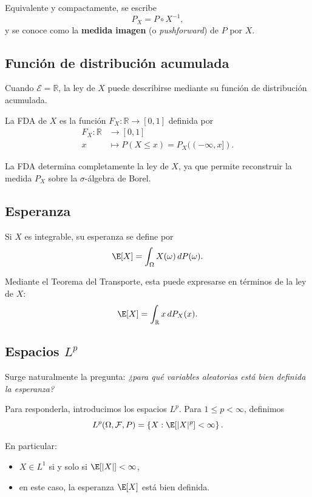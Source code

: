 Equivalente y compactamente, se escribe
\[
P_X = P \circ X^{-1},
\]
y se conoce como la \textbf{medida imagen} (o \textit{pushforward}) de $P$ por $X$.

\subsection{Función de distribución acumulada}

Cuando $\mathcal{E} = \mathbb{R}$, la ley de $X$ puede describirse mediante su función de distribución acumulada.

\begin{defi}
La FDA de $X$ es la función $F_X:\mathbb{R} \to [0,1]$ definida por
\[
\begin{aligned}
F_X : \mathbb{R} &\to [0,1] \\
x &\mapsto P(X \leq x) = P_X((-\infty, x]).
\end{aligned}
\]
\end{defi}

La FDA determina completamente la ley de $X$, ya que permite reconstruir la medida $P_X$ sobre la $\sigma$-álgebra de Borel.

\subsection{Esperanza}

\begin{defi}[Esperanza]
Si $X$ es integrable, su esperanza se define por
\[
\E[X] = \int_{\Omega} X(\omega) \, dP(\omega).
\]
\end{defi}

Mediante el Teorema del Transporte, esta puede expresarse en términos de la ley de $X$:
\[
\E[X] = \int_{\mathbb{R}} x \, dP_X(x).
\]

\subsection{Espacios \texorpdfstring{$L^p$}{Lp}}

Surge naturalmente la pregunta: \textit{¿para qué variables aleatorias está bien definida la esperanza?}

Para responderla, introducimos los espacios $L^p$. Para $1 \leq p < \infty$, definimos
\[
L^p(\Omega,\mathcal{F},P)
= \left\{ X : \E[|X|^p] < \infty \right\}.
\]

En particular:
\begin{itemize}
\item $X \in L^1$ si y solo si $\E[|X|] < \infty$,
\item en este caso, la esperanza $\E[X]$ está bien definida.
\end{itemize}

